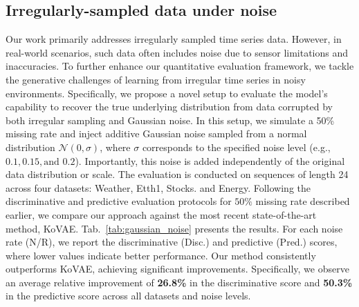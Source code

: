 \documentclass{article}
\theoremstyle{plain}
\theoremstyle{definition}
\theoremstyle{remark}
\begin{document}
\vspace{-2mm}
\subsection{Irregularly-sampled data under noise}
\vspace{-2mm}
Our work primarily addresses irregularly sampled time series data. However, in real-world scenarios, such data often includes noise due to sensor limitations and inaccuracies. To further enhance our quantitative evaluation framework, we tackle the generative challenges of learning from irregular time series in noisy environments. Specifically, we propose a novel setup to evaluate the model's capability to recover the true underlying distribution from data corrupted by both irregular sampling and Gaussian noise. In this setup, we simulate a 50\% missing rate and inject additive Gaussian noise sampled from a normal distribution $\mathcal{N}(0, \sigma)$, where $\sigma$ corresponds to the specified noise level (e.g., $0.1, 0.15, \text{and } 0.2$). Importantly, this noise is added independently of the original data distribution or scale. The evaluation is conducted on sequences of length 24 across four datasets: Weather, Etth1, Stocks. and Energy.  Following the discriminative and predictive evaluation protocols for $50\%$ missing rate described earlier, we compare our approach against the most recent state-of-the-art method, KoVAE. Tab.~\ref{tab:gaussian_noise} presents the results. For each noise rate (N/R), we report the discriminative (Disc.) and predictive (Pred.) scores, where lower values indicate better performance. Our method consistently outperforms KoVAE, achieving significant improvements. Specifically, we observe an average relative improvement of \textbf{26.8\%} in the discriminative score and \textbf{50.3\%} in the predictive score across all datasets and noise levels.
\end{document}
